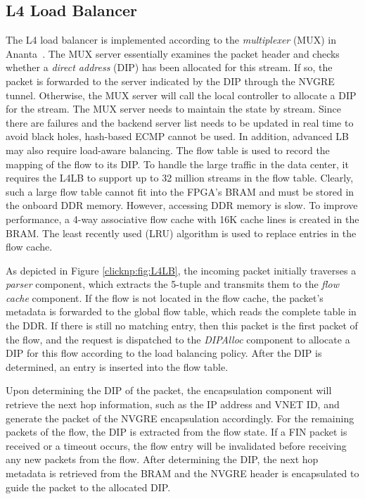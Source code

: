\subsection{L4 Load Balancer}
The L4 load balancer is implemented according to the \textit{multiplexer} (MUX) in Ananta~\cite{ananta}. The MUX server essentially examines the packet header and checks whether a \textit{direct address} (DIP) has been allocated for this stream. If so, the packet is forwarded to the server indicated by the DIP through the NVGRE tunnel. Otherwise, the MUX server will call the local controller to allocate a DIP for the stream. The MUX server needs to maintain the state by stream. Since there are failures and the backend server list needs to be updated in real time to avoid black holes, hash-based ECMP cannot be used. In addition, advanced LB may also require load-aware balancing. The flow table is used to record the mapping of the flow to its DIP. To handle the large traffic in the data center, it requires the L4LB to support up to 32 million streams in the flow table. Clearly, such a large flow table cannot fit into the FPGA's BRAM and must be stored in the onboard DDR memory. However, accessing DDR memory is slow. To improve performance, a 4-way associative flow cache with 16K cache lines is created in the BRAM. The least recently used (LRU) algorithm is used to replace entries in the flow cache.

As depicted in Figure \ref{clicknp:fig:L4LB}, the incoming packet initially traverses a \textit{parser} component, which extracts the 5-tuple and transmits them to the \textit{flow cache} component. If the flow is not located in the flow cache, the packet's metadata is forwarded to the global flow table, which reads the complete table in the DDR. If there is still no matching entry, then this packet is the first packet of the flow, and the request is dispatched to the \textit{DIPAlloc} component to allocate a DIP for this flow according to the load balancing policy. After the DIP is determined, an entry is inserted into the flow table.

Upon determining the DIP of the packet, the encapsulation component will retrieve the next hop information, such as the IP address and VNET ID, and generate the packet of the NVGRE encapsulation accordingly. For the remaining packets of the flow, the DIP is extracted from the flow state. If a FIN packet is received or a timeout occurs, the flow entry will be invalidated before receiving any new packets from the flow. After determining the DIP, the next hop metadata is retrieved from the BRAM and the NVGRE header is encapsulated to guide the packet to the allocated DIP.

